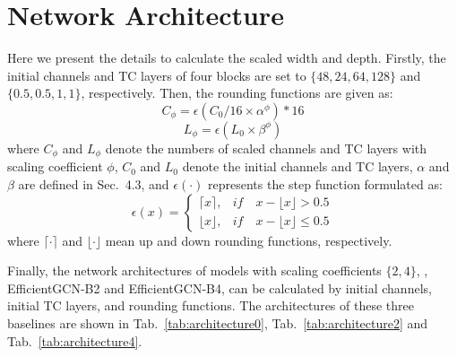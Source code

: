 \documentclass[10pt,journal,compsoc]{IEEEtran}
\begin{document}
\newpage
\appendices
\setcounter{page}{1}
\setcounter{equation}{0}
\renewcommand\theequation{S.\arabic{equation}}
\setcounter{table}{0}
\renewcommand\thetable{S.\arabic{table}}
\setcounter{figure}{0}
\renewcommand\thefigure{S.\arabic{figure}}

\section{Network Architecture}
\label{asec:architectures}

Here we present the details to calculate the scaled width and depth. Firstly, the initial channels and TC layers of four blocks are set to $\{48,24,64,128\}$ and $\{0.5,0.5,1,1\}$, respectively. Then, the rounding functions are given as:
\begin{equation}
  C_\phi=\epsilon(C_0/16\times\alpha^\phi)*16
\end{equation}
\begin{equation}
  L_\phi=\epsilon(L_0\times\beta^\phi)
\end{equation}
where $C_\phi$ and $L_\phi$ denote the numbers of scaled channels and TC layers with scaling coefficient $\phi$, $C_0$ and $L_0$ denote the initial channels and TC layers, $\alpha$ and $\beta$ are defined in Sec.~4.3, and $\epsilon(\cdot)$ represents the step function formulated as:
\begin{equation}
  \epsilon(x)=\left\{\begin{matrix}
    \lceil x \rceil, & if \quad x-\lfloor x \rfloor>0.5 \\
    \lfloor x \rfloor, & if \quad x-\lfloor x \rfloor\leq0.5
  \end{matrix}\right.
\end{equation}
where $\lceil \cdot \rceil$ and $\lfloor \cdot \rfloor$ mean up and down rounding functions, respectively.

Finally, the network architectures of models with scaling coefficients $\{2,4\}$, \ie, EfficientGCN-B2 and EfficientGCN-B4, can be calculated by initial channels, initial TC layers, and rounding functions. The architectures of these three baselines are shown in Tab.~\ref{tab:architecture0}, Tab.~\ref{tab:architecture2} and Tab.~\ref{tab:architecture4}.
\end{document}
